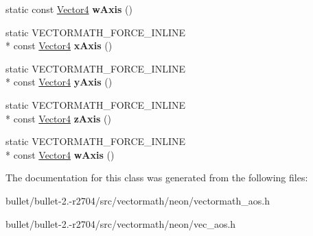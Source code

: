 \begin{DoxyCompactItemize}
\item 
\hypertarget{class_vectormath_1_1_aos_1_1_vector4_abbc20037e0d85b41e2203ef8e060f4ef}{static const \hyperlink{class_vectormath_1_1_aos_1_1_vector4}{Vector4} {\bfseries w\+Axis} ()}\label{class_vectormath_1_1_aos_1_1_vector4_abbc20037e0d85b41e2203ef8e060f4ef}

\item 
\hypertarget{class_vectormath_1_1_aos_1_1_vector4_a09a8676490aaec4e55f7dba565e80a2e}{static V\+E\+C\+T\+O\+R\+M\+A\+T\+H\+\_\+\+F\+O\+R\+C\+E\+\_\+\+I\+N\+L\+I\+N\+E \\*
const \hyperlink{class_vectormath_1_1_aos_1_1_vector4}{Vector4} {\bfseries x\+Axis} ()}\label{class_vectormath_1_1_aos_1_1_vector4_a09a8676490aaec4e55f7dba565e80a2e}

\item 
\hypertarget{class_vectormath_1_1_aos_1_1_vector4_a68b1ac02f902acde484477097984c4a6}{static V\+E\+C\+T\+O\+R\+M\+A\+T\+H\+\_\+\+F\+O\+R\+C\+E\+\_\+\+I\+N\+L\+I\+N\+E \\*
const \hyperlink{class_vectormath_1_1_aos_1_1_vector4}{Vector4} {\bfseries y\+Axis} ()}\label{class_vectormath_1_1_aos_1_1_vector4_a68b1ac02f902acde484477097984c4a6}

\item 
\hypertarget{class_vectormath_1_1_aos_1_1_vector4_ad6a013a14fadcd7ec9ef877c144199ef}{static V\+E\+C\+T\+O\+R\+M\+A\+T\+H\+\_\+\+F\+O\+R\+C\+E\+\_\+\+I\+N\+L\+I\+N\+E \\*
const \hyperlink{class_vectormath_1_1_aos_1_1_vector4}{Vector4} {\bfseries z\+Axis} ()}\label{class_vectormath_1_1_aos_1_1_vector4_ad6a013a14fadcd7ec9ef877c144199ef}

\item 
\hypertarget{class_vectormath_1_1_aos_1_1_vector4_a7f637835f97bf181c3b6ced0ac122593}{static V\+E\+C\+T\+O\+R\+M\+A\+T\+H\+\_\+\+F\+O\+R\+C\+E\+\_\+\+I\+N\+L\+I\+N\+E \\*
const \hyperlink{class_vectormath_1_1_aos_1_1_vector4}{Vector4} {\bfseries w\+Axis} ()}\label{class_vectormath_1_1_aos_1_1_vector4_a7f637835f97bf181c3b6ced0ac122593}

\end{DoxyCompactItemize}


The documentation for this class was generated from the following files\+:\begin{DoxyCompactItemize}
\item 
bullet/bullet-\/2.-\/r2704/src/vectormath/neon/vectormath\+\_\+aos.\+h\item 
bullet/bullet-\/2.-\/r2704/src/vectormath/neon/vec\+\_\+aos.\+h\end{DoxyCompactItemize}

